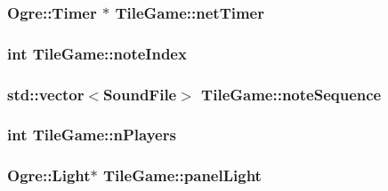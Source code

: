 \hypertarget{classTileGame_a0193bc10ab8efe7cbf37ec7d41378b55}{
\subsubsection[{net\-Timer}]{\setlength{\rightskip}{0pt plus 5cm}Ogre\-::\-Timer $\ast$ Tile\-Game\-::net\-Timer\hspace{0.3cm}{\ttfamily [protected]}}}\label{classTileGame_a0193bc10ab8efe7cbf37ec7d41378b55}
\hypertarget{classTileGame_ae301ffc70ac15755e4fd6f8561aeaf30}{
\subsubsection[{note\-Index}]{\setlength{\rightskip}{0pt plus 5cm}int Tile\-Game\-::note\-Index\hspace{0.3cm}{\ttfamily [protected]}}}\label{classTileGame_ae301ffc70ac15755e4fd6f8561aeaf30}
\hypertarget{classTileGame_a89f75175ed666995704d8bad09762612}{
\subsubsection[{note\-Sequence}]{\setlength{\rightskip}{0pt plus 5cm}std\-::vector$<${\bf Sound\-File}$>$ Tile\-Game\-::note\-Sequence\hspace{0.3cm}{\ttfamily [protected]}}}\label{classTileGame_a89f75175ed666995704d8bad09762612}
\hypertarget{classTileGame_a232f92064d80b722b022a3845be35b9e}{
\subsubsection[{n\-Players}]{\setlength{\rightskip}{0pt plus 5cm}int Tile\-Game\-::n\-Players\hspace{0.3cm}{\ttfamily [protected]}}}\label{classTileGame_a232f92064d80b722b022a3845be35b9e}
\hypertarget{classTileGame_a23db72b0263e4d5595c1f170cc312185}{
\subsubsection[{panel\-Light}]{\setlength{\rightskip}{0pt plus 5cm}Ogre\-::\-Light$\ast$ Tile\-Game\-::panel\-Light\hspace{0.3cm}{\ttfamily [protected]}}}\label{classTileGame_a23db72b0263e4d5595c1f170cc312185}
